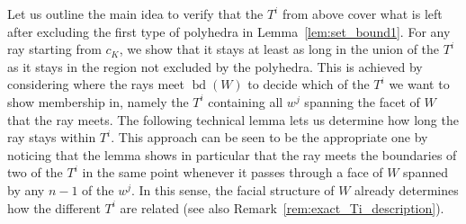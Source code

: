 \documentclass{amsart}
\DeclareMathOperator{\bd}{bd}
\begin{document}
Let us outline the main idea to verify that the $T^i$ from above cover what is left after excluding the first type of polyhedra in Lemma~\ref{lem:set_bound1}.
For any ray starting from $c_K$,
we show that it stays at least as long in the union of the $T^i$ as it stays in the region not excluded by the polyhedra.
This is achieved by considering where the rays meet $\bd(W)$ to decide which of the $T^i$ we want to show membership in,
namely the $T^i$ containing all $w^j$ spanning the facet of $W$ that the ray meets.
The following technical lemma lets us determine how long the ray stays within $T^i$.
This approach can be seen to be the appropriate one by noticing that the lemma shows in particular that the ray meets the boundaries of two of the $T^i$ in the same point whenever it passes through a face of $W$ spanned by any $n-1$ of the $w^j$.
In this sense, the facial structure of $W$ already determines how the different $T^i$ are related (see also Remark~\ref{rem:exact_Ti_description}).
\end{document}
